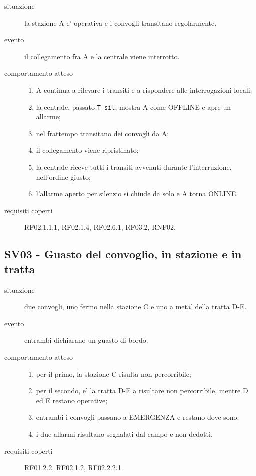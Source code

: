 \documentclass[11pt]{article}
\begin{document}
\begin{description}
\item[{situazione}] la stazione A e' operativa e i convogli transitano regolarmente.
\item[{evento}] il collegamento fra A e la centrale viene interrotto.
\item[{comportamento atteso}] \begin{enumerate}
\item A continua a rilevare i transiti e a rispondere alle interrogazioni locali;
\item la centrale, passato \texttt{T\_sil}, mostra A come OFFLINE e apre un allarme;
\item nel frattempo transitano dei convogli da A;
\item il collegamento viene ripristinato;
\item la centrale riceve tutti i transiti avvenuti durante l'interruzione, nell'ordine giusto;
\item l'allarme aperto per silenzio si chiude da solo e A torna ONLINE.
\end{enumerate}
\item[{requisiti coperti}] RF02.1.1.1, RF02.1.4, RF02.6.1, RF03.2, RNF02.
\end{description}
\subsection{SV03 - Guasto del convoglio, in stazione e in tratta}
\label{sec:orgd529a38}

\begin{description}
\item[{situazione}] due convogli, uno fermo nella stazione C e uno a meta' della tratta D-E.
\item[{evento}] entrambi dichiarano un guasto di bordo.
\item[{comportamento atteso}] \begin{enumerate}
\item per il primo, la stazione C risulta non percorribile;
\item per il secondo, e' la tratta D-E a risultare non percorribile, mentre D ed E restano operative;
\item entrambi i convogli passano a EMERGENZA e restano dove sono;
\item i due allarmi risultano segnalati dal campo e non dedotti.
\end{enumerate}
\item[{requisiti coperti}] RF01.2.2, RF02.1.2, RF02.2.2.1.
\end{description}
\end{document}

